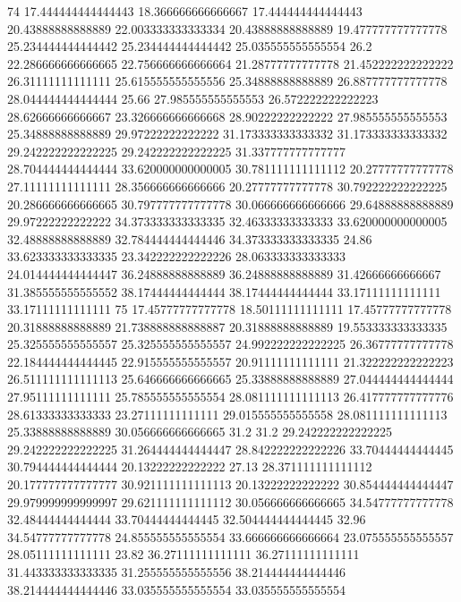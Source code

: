 74 17.444444444444443 18.366666666666667 17.444444444444443 20.43888888888889 22.003333333333334 20.43888888888889 19.477777777777778 25.234444444444442 25.234444444444442 25.035555555555554 26.2 22.286666666666665 22.756666666666664 21.28777777777778 21.452222222222222 26.31111111111111 25.615555555555556 25.34888888888889 26.887777777777778 28.044444444444444 25.66 27.985555555555553 26.572222222222223 28.62666666666667 23.326666666666668 28.90222222222222 27.985555555555553 25.34888888888889 29.97222222222222 31.173333333333332 31.173333333333332 29.242222222222225 29.242222222222225 31.337777777777777 28.704444444444444 33.620000000000005 30.781111111111112 20.27777777777778 27.11111111111111 28.356666666666666 20.27777777777778 30.792222222222225 20.286666666666665 30.797777777777778 30.066666666666666 29.64888888888889 29.97222222222222 34.373333333333335 32.46333333333333 33.620000000000005 32.48888888888889 32.784444444444446 34.373333333333335 24.86 33.623333333333335 23.342222222222226 28.063333333333333 24.014444444444447 36.24888888888889 36.24888888888889 31.42666666666667 31.385555555555552 38.17444444444444 38.17444444444444 33.17111111111111 33.17111111111111
75 17.45777777777778 18.50111111111111 17.45777777777778 20.31888888888889 21.738888888888887 20.31888888888889 19.553333333333335 25.325555555555557 25.325555555555557 24.992222222222225 26.36777777777778 22.184444444444445 22.915555555555557 20.91111111111111 21.322222222222223 26.511111111111113 25.646666666666665 25.33888888888889 27.044444444444444 27.95111111111111 25.785555555555554 28.081111111111113 26.417777777777776 28.61333333333333 23.27111111111111 29.015555555555558 28.081111111111113 25.33888888888889 30.056666666666665 31.2 31.2 29.242222222222225 29.242222222222225 31.264444444444447 28.842222222222226 33.70444444444445 30.794444444444444 20.13222222222222 27.13 28.371111111111112 20.177777777777777 30.921111111111113 20.13222222222222 30.854444444444447 29.979999999999997 29.621111111111112 30.056666666666665 34.54777777777778 32.48444444444444 33.70444444444445 32.504444444444445 32.96 34.54777777777778 24.855555555555554 33.666666666666664 23.075555555555557 28.05111111111111 23.82 36.27111111111111 36.27111111111111 31.443333333333335 31.255555555555556 38.214444444444446 38.214444444444446 33.035555555555554 33.035555555555554
